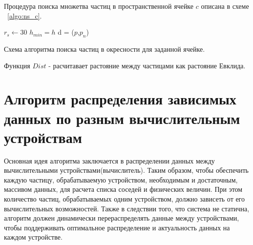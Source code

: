 Процедура поиска множетва частиц в пространственной ячейке \(c\) описана в схеме ~\ref{algo:ns_c}.

\begin{algorithm}[H]
  \label{algo:ns_c}
  \SetAlgoLined
  $r_s  \leftarrow 30 $\;
  $h_{min} = h$\;
  {
    d = \Dist($p$,$p_{n}$)\;
  }
  \caption{Схема алгоритма поиска частиц в окресности для заданной ячейке.}
\end{algorithm}

Функция \( Dist \) - расчитавает растояние между частицами как растояние Евклида.

\section{Алгоритм распределения зависимых данных по разным вычислительным устройствам}\label{sec:ch2/sec3}
Основная идея алгоритма заключается в распределении данных между вычислительными устройствами(вычислитель). Таким образом, чтобы обеспечить каждую частицу, обрабатываемую устройством, необходимым и достаточным, массивом данных, для расчета списка соседей и физических величин. При этом количество частиц, обрабатываемых одним устройством, должно зависеть от его вычислительных возможностей. Также в следствии того, что система не статична, алгоритм должен динамически перераспределять данные между устройствами, чтобы поддерживать оптимальное распределение и актуальность данных на каждом устройстве.

